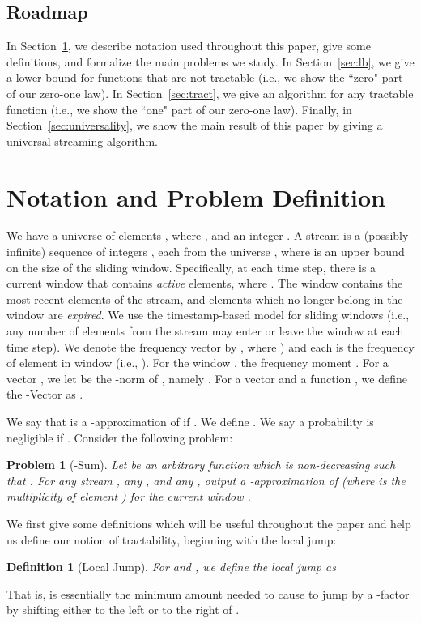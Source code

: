 \documentclass[11pt]{article}
\newtheorem{defn}{Definition}
\newtheorem{prob}{Problem}
\begin{document}
\subsection{Roadmap}
In Section~\ref{sec:prob}, we describe notation used throughout this paper, give some definitions, and formalize the main
problems we study.  In Section~\ref{sec:lb}, we give a lower bound for functions that are not tractable (i.e., we show the ``zero"
part of our zero-one law).  In Section~\ref{sec:tract}, we give an algorithm for any tractable function (i.e., we show the ``one" part
of our zero-one law).  Finally, in Section~\ref{sec:universality}, we show the main result of this paper by giving a universal
streaming algorithm.

\section{Notation and Problem Definition}
\label{sec:prob}
We have a universe of  elements , where , and an integer .
A stream  is a (possibly infinite) sequence of integers , each from
the universe , where  is an upper bound on the size of the sliding window.  Specifically,
at each time step, there is a current window  that contains \emph{active} elements, where .
The window  contains the most recent elements of the stream,
and elements which no longer belong in the window are \emph{expired}.  We use the
timestamp-based model for sliding windows (i.e., any number of elements from the stream
may enter or leave the window at each time step).  We denote the frequency vector
by , where ) and each  is the frequency of element 
in window  (i.e., ).  For the
window , the  frequency moment .
For a vector , we let  be the -norm of , namely
.  For a vector  and a function , we define the
-Vector as .

We say that  is a -approximation of  if .  We define .  We say a probability  is negligible if .  Consider the following problem:

\begin{prob}[-Sum]
Let  be an arbitrary function which is non-decreasing such that .  For any stream
, any , and any , output a -approximation of  (where  is the multiplicity
of element ) for the current window .
\end{prob}

We first give some definitions which will be useful throughout the paper and help us define our notion
of tractability, beginning with the local jump:

\begin{defn}[Local Jump]
For  and , we define the local jump as

\end{defn}
\noindent That is,  is essentially the minimum amount needed to cause  to jump by a
-factor by shifting either to the left or to the right of .
\end{document}
